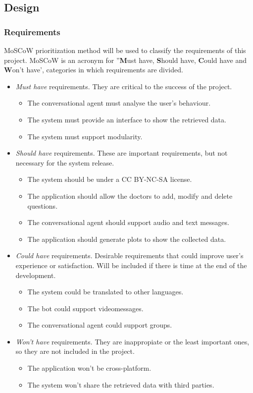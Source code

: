 \documentclass[12pt,english]{article}
\begin{document}
\subsection{Design}

\subsubsection{Requirements}
MoSCoW prioritization method \cite{moscow} will be used to classify the requirements of this project. MoSCoW is an acronym for ''\textbf{M}ust have, \textbf{S}hould have, \textbf{C}ould have and \textbf{W}on't have', categories in which requirements are divided.
\begin{itemize}
  \item \emph{Must have} requirements. They are critical to the success of the project.
    \begin{itemize}
      \item The conversational agent must analyse the user's behaviour.
      \item The system must provide an interface to show the retrieved data.
      \item The system must support modularity.
    \end{itemize}
  \item \emph{Should have} requirements. These are important requirements, but not necessary for  the system release.
    \begin{itemize}
      \item The system should be under a CC BY-NC-SA \cite{CC} license.
      \item The application should allow the doctors to add, modify and delete questions.
      \item The conversational agent should support audio and text messages.
      \item The application should generate plots to show the collected data.
    \end{itemize}
  \item \emph{Could have} requirements. Desirable requirements that could improve user's experience or satisfaction. Will be included if there is time at the end of the development.
    \begin{itemize}
      \item The system could be translated to other languages.
      \item The bot could support videomessages.
      \item The conversational agent could support groups.
    \end{itemize}
  \item \emph{Won't have} requirements. They are inappropiate or the least important ones, so they are not included in the project.
    \begin{itemize}
      \item The application won't be cross-platform.
      \item The system won't share the retrieved data with third parties.
    \end{itemize}
\end{itemize}
\end{document}
